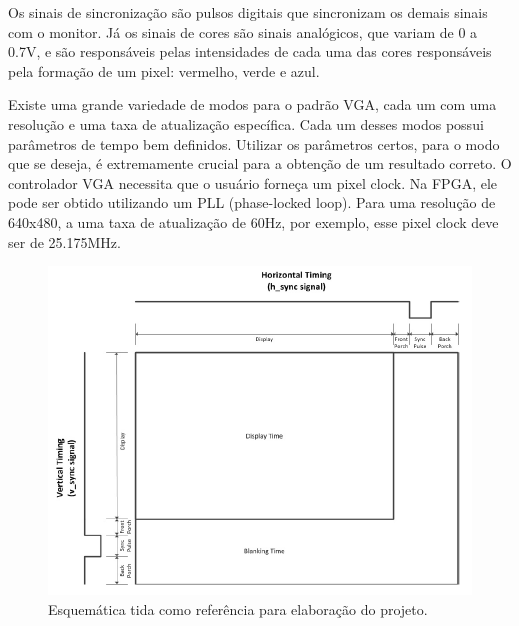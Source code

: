 \documentclass[14pt, oneside]{book}
\newcommand\tab[1][1cm]{\hspace*{#1}}
\theoremstyle{definition}
\begin{document}
            
            \tab Os sinais de sincronização são pulsos digitais que sincronizam os demais sinais com o monitor. Já os sinais de cores são sinais analógicos, que variam de 0 a 0.7V, e são responsáveis pelas intensidades de cada uma das cores responsáveis pela formação de um pixel: vermelho, verde e azul.
            
             \tab Existe uma grande variedade de modos para o padrão VGA, cada um com uma resolução e uma taxa de atualização específica. Cada um desses modos possui parâmetros de tempo bem definidos. Utilizar os parâmetros certos, para o modo que se deseja, é extremamente crucial para a obtenção de um resultado correto. O controlador VGA necessita que o usuário forneça um pixel clock. Na FPGA, ele pode ser obtido utilizando um PLL (phase-locked loop). Para uma resolução de 640x480, a uma taxa de atualização de 60Hz, por exemplo, esse pixel clock deve ser de 25.175MHz.
             
              \begin{figure}[H]
                    \centering
                    \includegraphics[scale=0.8]{vga.PNG}
                    \caption{Esquemática tida como referência para elaboração do projeto.}
                    \label{vga}
                \end{figure}
             
\end{document}
